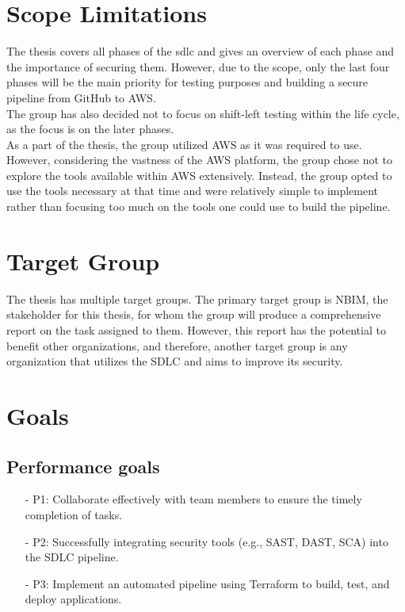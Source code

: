  
\section{Scope Limitations}
The thesis covers all phases of the \acrlong{sdlc} and gives an overview of each phase and the importance of securing them. However, due to the scope, only the last four phases will be the main priority for testing purposes and building a secure pipeline from GitHub to AWS.
\\
The group has also decided not to focus on \gls{shift-left} testing within the life cycle, as the focus is on the later phases. 
\\
As a part of the thesis, the group utilized AWS as it was required to use. However, considering the vastness of the AWS platform, the group chose not to explore the tools available within AWS extensively. Instead, the group opted to use the tools necessary at that time and were relatively simple to implement rather than focusing too much on the tools one could use to build the pipeline.

\section{Target Group}
The thesis has multiple target groups. The primary target group is NBIM, the stakeholder for this thesis, for whom the group will produce a comprehensive report on the task assigned to them. However, this report has the potential to benefit other organizations, and therefore, another target group is any organization that utilizes the SDLC and aims to improve its security.

\section{Goals}
\subsection{Performance goals}
\begin{itemize}
    \item[-] P1: Collaborate effectively with team members to ensure the timely completion of tasks. 
    
    \item[-] P2: Successfully integrating security tools (e.g., SAST, DAST, SCA) into the SDLC pipeline. 
    
    \item[-] P3: Implement an automated pipeline using Terraform to build, test, and deploy applications.
\end{itemize}

